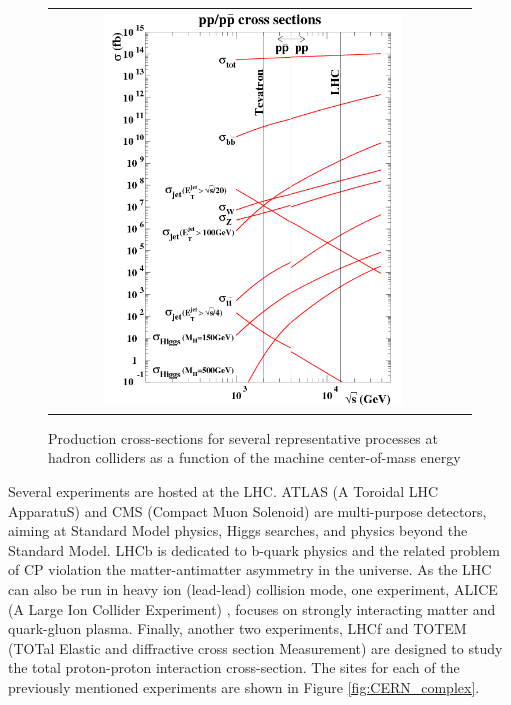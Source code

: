 \begin{figure}[tbh!]
	\centering
	\begin{tabular}{cc}
		\includegraphics[width=0.75\textwidth]{detector/pics/LHC_xsec.png}
	\end{tabular}
	\caption{Production cross-sections for several representative processes at hadron colliders as a function of the machine center-of-mass energy}
	\label{fig:LHC_xsec}
\end{figure}


Several experiments are hosted at the LHC. ATLAS (A Toroidal LHC ApparatuS) \cite{det::ATLAS} and CMS (Compact Muon Solenoid) \cite{Chatrchyan:2008zzk} are multi-purpose detectors, aiming at Standard Model physics, Higgs searches, and physics beyond the Standard Model. LHCb \cite{det::LHCb} is dedicated to b-quark physics and the related problem of CP violation the matter-antimatter asymmetry in the universe. As the LHC can also be run in heavy ion (lead-lead) collision mode, one experiment, ALICE (A Large Ion Collider Experiment) \cite{det::ALICE}, focuses on strongly interacting matter and quark-gluon plasma. Finally, another two experiments, LHCf \cite{Adriani:2008zz} and TOTEM (TOTal Elastic and diffractive cross section Measurement) \cite{Anelli:2008zza} are designed to study the total proton-proton interaction cross-section. The sites for each of the previously mentioned experiments are shown in Figure \ref{fig:CERN_complex}. 

